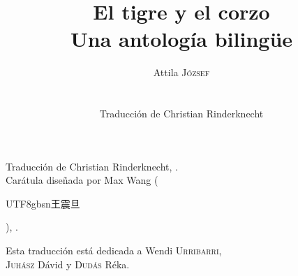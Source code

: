 \documentclass[11pt]{extbook}
\title{El tigre y el corzo\\ {\large Una antología bilingüe}}
\author{{\Large Attila \textsc{József}}\\\\\\
Traducción de Christian Rinderknecht}
\date{\oldstylenums{2026}}
\makeatletter
\newcommand*{\centeredornament}{\centerline{\pgfornament[width=6cm]{88}}}
\renewcommand{\tableofcontents}{%
  \def\contentsname{\empty}
  \chapter*{\contentsname}%
  \vspace*{-10em} %
  \@starttoc{toc}%
}
\newcommand{\zh}[1]{\begin{CJK}{UTF8}{gbsn}#1\end{CJK}}
\makeatother
\begin{document}
\pagestyle{empty}



\mbox{}

\newpage

\mbox{}

\newpage

\maketitle

\vspace*{\fill}

\begin{flushright}
  \textcopyright{} Traducción de Christian Rinderknecht,
  .\\
  \textcopyright{} Carátula diseñada por Max Wang (\zh{王震旦}), .
\end{flushright}

\newpage

\vspace*{4cm}

\begin{flushright}
  Esta traducción está dedicada a Wendi \textsc{Urribarri}, \\
  \textsc{Juhász} Dávid y \textsc{Dudás} Réka.
\end{flushright}

\newpage
\newpage

%

\tableofcontents


\clearpage
\pagestyle{plain}


\vspace*{-15mm}
\centeredornament


\end{document}
